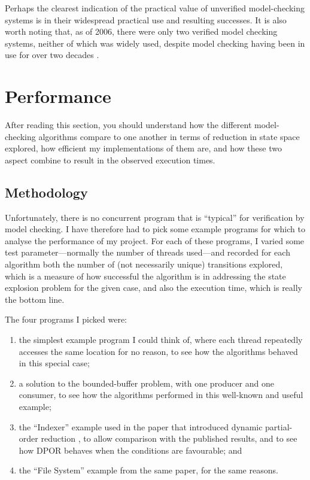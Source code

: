 \documentclass[12pt,a4paper,twoside,openright]{report}
\begin{document}
Perhaps the clearest indication of the
practical value of unverified
model-checking systems is in their widespread
practical use and resulting successes.
\cite{kur08, brat04, est12, kars96, cof10, mill08}
It is also worth noting that, as of 2006,
there were only
two verified model checking
systems, neither of which was widely
used, despite model
checking having been in use for
over two decades \cite{beck06}.


\section{Performance}
After reading this section, you should
understand how the different
model-checking algorithms compare to
one another in terms of reduction in
state space explored,
how efficient my implementations of
them are, and how these two aspect
combine to result in the observed execution
times.

\subsection{Methodology}
Unfortunately, there is no concurrent program
that is ``typical'' for verification by model
checking. I have therefore had to pick some
example programs for which to analyse the performance
of my project. For each of these programs, I varied
some test parameter---normally the number of threads
used---and recorded for each algorithm
both the number of (not necessarily unique) transitions
explored, which is a measure of how successful
the algorithm is in addressing the state
explosion problem for the given case, and also
the execution time, which is really the bottom
line.

The four programs I picked were:
\begin{enumerate}
	\item the simplest example program I could think of, where
	each thread repeatedly accesses the same location
	for no reason,
	to see how the algorithms behaved in this special
	case;
	\item a solution to the bounded-buffer problem,
	with one producer and one consumer, to see how
	the algorithms performed in this well-known
	and useful example;
	\item the ``Indexer'' example used in the paper
	that introduced dynamic partial-order reduction \cite{flan05},
	to allow comparison with the published results, and
	to see how DPOR behaves when the conditions are
	favourable; and
	\item the ``File System'' example from the same paper,
	for the same reasons.
\end{enumerate}
\end{document}
